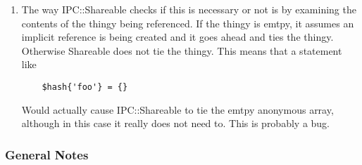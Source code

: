 \begin{enumerate}
\item
The way IPC::Shareable checks if this is necessary or not is by
examining the contents of the thingy being referenced.  If the thingy
is emtpy, it assumes an implicit reference is being created and it
goes ahead and ties the thingy.  Otherwise Shareable does not tie the
thingy.  This means that a statement like
\begin{verbatim}
    $hash{'foo'} = {}
\end{verbatim}

Would actually cause IPC::Shareable to tie the emtpy anonymous array,
although in this case it really does not need to.  This is probably a
bug.

\end{enumerate}

\subsubsection*{General Notes}%

